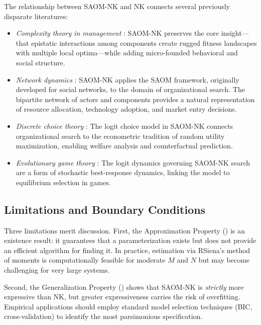 \documentclass[12pt]{article}
\begin{document}
The relationship between SAOM-NK and NK connects several previously
disparate literatures:
\begin{itemize}
  \item \emph{Complexity theory in management}
        \citep{kauffman1993origins, levinthal1997adaptation}: SAOM-NK
        preserves the core insight---that epistatic interactions among
        components create rugged fitness landscapes with multiple local
        optima---while adding micro-founded behavioral and social structure.

  \item \emph{Network dynamics}
        \citep{snijders2010introduction}: SAOM-NK applies the SAOM
        framework, originally developed for social networks, to the
        domain of organizational search. The bipartite network of actors
        and components provides a natural representation of resource
        allocation, technology adoption, and market entry decisions.

  \item \emph{Discrete choice theory}
        \citep{mcfadden1974conditional, mcfadden2000mixed}: The logit
        choice model in SAOM-NK connects organizational search to the
        econometric tradition of random utility maximization, enabling
        welfare analysis and counterfactual prediction.

  \item \emph{Evolutionary game theory}
        \citep{blume1993statistical}: The logit dynamics governing SAOM-NK
        search are a form of stochastic best-response dynamics, linking
        the model to equilibrium selection in games.
\end{itemize}

\subsection{Limitations and Boundary Conditions}

Three limitations merit discussion. First, the Approximation Property
() is an existence result: it guarantees that a
parameterization exists but does not provide an efficient algorithm for
finding it. In practice, estimation via RSiena's method of moments is
computationally feasible for moderate $M$ and $N$ but may become
challenging for very large systems.

Second, the Generalization Property () shows that
SAOM-NK is \emph{strictly} more expressive than NK, but greater
expressiveness carries the risk of overfitting. Empirical applications
should employ standard model selection techniques (BIC, cross-validation)
to identify the most parsimonious specification.
\end{document}
